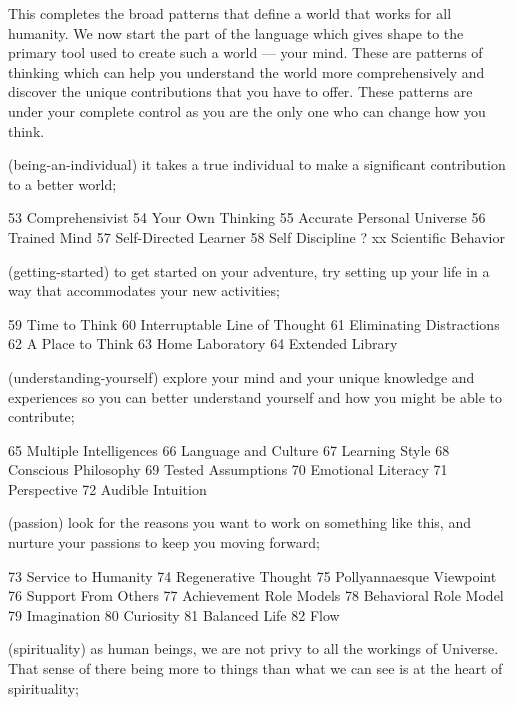 This completes the broad patterns that define a world that works for all humanity. We now start the part of the language which gives shape to the primary tool used to create such a world — your mind. These are patterns of thinking which can help you understand the world more comprehensively and discover the unique contributions that you have to offer. These patterns are under your complete control as you are the only one who can change how you think.



(being-an-individual) it takes a true individual to make a significant contribution to a better world;

	53  Comprehensivist
	54  Your Own Thinking
	55  Accurate Personal Universe
	56  Trained Mind
	57  Self-Directed Learner
	58  Self Discipline
?	xx  Scientific Behavior   %

(getting-started) to get started on your adventure, try setting up your life in a way that accommodates your new activities;

	59  Time to Think
	60  Interruptable Line of Thought
	61  Eliminating Distractions
	62  A Place to Think
	63  Home Laboratory
	64  Extended Library

(understanding-yourself) explore your mind and your unique knowledge and experiences so you can better understand yourself and how you might be able to contribute;

	65  Multiple Intelligences
	66  Language and Culture
	67  Learning Style
	68  Conscious Philosophy
	69  Tested Assumptions
	70  Emotional Literacy
	71  Perspective
	72  Audible Intuition

(passion) look for the reasons you want to work on something like this, and nurture your passions to keep you moving forward;

	73  Service to Humanity
	74  Regenerative Thought
	75  Pollyannaesque Viewpoint
	76  Support From Others
	77  Achievement Role Models
	78  Behavioral Role Model
	79  Imagination
	80  Curiosity
	81  Balanced Life
	82  Flow

(spirituality) as human beings, we are not privy to all the workings of Universe. That sense of there being more to things than what we can see is at the heart of spirituality;

